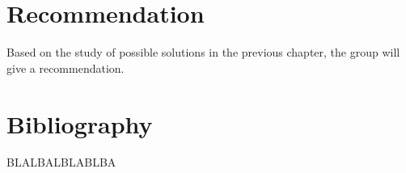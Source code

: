 \documentclass[11pt,a4paper,titlepage,oneside]{report}
\begin{document}
\chapter{Recommendation}
Based on the study of possible solutions in the previous chapter, the group will give a recommendation.

\chapter{Bibliography}

\begin{flushleft}
	
	 BLALBALBLABLBA
\end{flushleft}

\appendix
\end{document}
